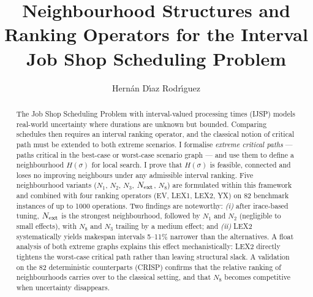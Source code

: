 \documentclass[preprint,12pt]{elsarticle}
\begin{document}
\begin{frontmatter}


\title{Neighbourhood Structures and Ranking Operators for the Interval Job Shop Scheduling Problem}

\author[uo]{Hern\'an D\'{\i}az Rodr\'{\i}guez}


\begin{abstract}
The Job Shop Scheduling Problem with interval-valued processing times (IJSP) models real-world uncertainty where durations are unknown but bounded. Comparing schedules then requires an interval ranking operator, and the classical notion of critical path must be extended to both extreme scenarios. I formalise \emph{extreme critical paths} --- paths critical in the best-case or worst-case scenario graph --- and use them to define a neighbourhood $H(\sigma)$ for local search. I prove that $H(\sigma)$ is feasible, connected and loses no improving neighbours under any admissible interval ranking. Five neighbourhood variants ($N_1$, $N_2$, $N_3$, $N_{\rm ext}$, $N_8$) are formulated within this framework and combined with four ranking operators (EV, LEX1, LEX2, YX) on 82 benchmark instances of up to 1000 operations. Two findings are noteworthy: \emph{(i)} after irace-based tuning, $N_{\rm ext}$ is the strongest neighbourhood, followed by $N_1$ and $N_2$ (negligible to small effects), with $N_8$ and $N_3$ trailing by a medium effect; and \emph{(ii)} LEX2 systematically yields makespan intervals 5--11\% narrower than the alternatives. A float analysis of both extreme graphs explains this effect mechanistically: LEX2 directly tightens the worst-case critical path rather than leaving structural slack. A validation on the 82 deterministic counterparts (CRISP) confirms that the relative ranking of neighbourhoods carries over to the classical setting, and that $N_8$ becomes competitive when uncertainty disappears.
\end{abstract}

\begin{graphicalabstract}
\end{graphicalabstract}


\end{frontmatter}
\end{document}

